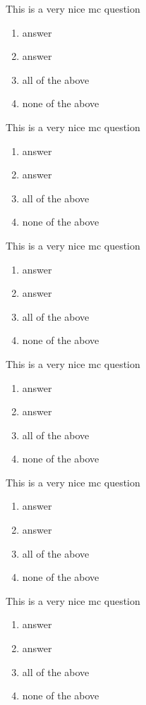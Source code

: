 \begin{multiplechoice}
    \item This is a very nice mc question
    \begin{enumerate}   
        \item answer  
        \item answer
        \item all of the above
        \item none of the above
    \end{enumerate}

    \item This is a very nice mc question
    \begin{enumerate}   
        \item answer  
        \item answer
        \item all of the above
        \item none of the above
    \end{enumerate}

    \item This is a very nice mc question
    \begin{enumerate}   
        \item answer  
        \item answer
        \item all of the above
        \item none of the above
    \end{enumerate}

    \item This is a very nice mc question
    \begin{enumerate}   
        \item answer  
        \item answer
        \item all of the above
        \item none of the above
    \end{enumerate}

    \item This is a very nice mc question
    \begin{enumerate}   
        \item answer  
        \item answer
        \item all of the above
        \item none of the above
    \end{enumerate}

    \item This is a very nice mc question
    \begin{enumerate}   
        \item answer  
        \item answer
        \item all of the above
        \item none of the above
    \end{enumerate}


\end{multiplechoice}
